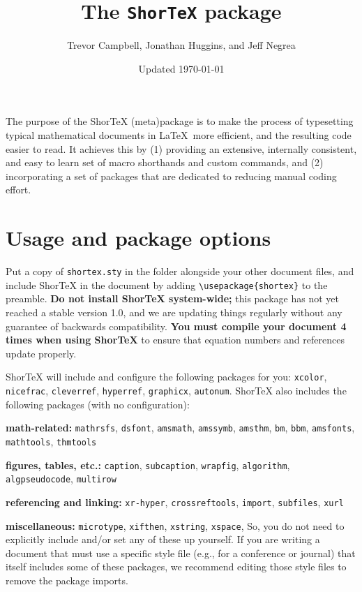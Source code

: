 \documentclass{article}
\title{The \texttt{ShorTeX} package}
\author{Trevor Campbell, Jonathan Huggins, and Jeff Negrea}
\date{Updated \today}
\begin{document}
\maketitle

\babs

The purpose of the ShorTeX (meta)package is to make the process of typesetting
typical mathematical documents in \LaTeX~more efficient, and the resulting
code easier to read.  It achieves this by
(1) providing an
extensive, internally consistent, and easy to learn set of macro
shorthands and custom commands, and
(2) incorporating a set of packages that are
dedicated to reducing manual coding effort.
\eabs


\tableofcontents

\section{Usage and package options}\label{sec:usage}

Put a copy of \texttt{shortex.sty} in the folder
alongside your other document files, and
include ShorTeX in the document by adding \verb!\usepackage{shortex}! to the preamble.
\textbf{Do not install ShorTeX system-wide;} this package has not yet reached a stable version 1.0,
and we are updating things regularly without any guarantee of backwards
compatibility.
\textbf{You must compile your document 4 times when using ShorTeX} to ensure that equation
numbers and references update properly.

ShorTeX will include and configure the following packages for you:
\texttt{xcolor},
\texttt{nicefrac},
\texttt{cleverref},
\texttt{hyperref},
\texttt{graphicx},
\texttt{autonum}.
ShorTeX also includes the following packages (with no configuration):
\bitem
\item \textbf{math-related:}  \texttt{mathrsfs}, \texttt{dsfont}, \texttt{amsmath}, \texttt{amssymb}, \texttt{amsthm}, \texttt{bm}, \texttt{bbm}, \texttt{amsfonts}, \texttt{mathtools}, \texttt{thmtools}
\item \textbf{figures, tables, etc.:}   \texttt{caption}, \texttt{subcaption}, \texttt{wrapfig}, \texttt{algorithm}, \linebreak \texttt{algpseudocode}, \texttt{multirow}
\item \textbf{referencing and linking:}  \texttt{xr-hyper}, \texttt{crossreftools}, \texttt{import}, \texttt{subfiles}, \texttt{xurl}
\item \textbf{miscellaneous:} \texttt{microtype}, \texttt{xifthen}, \texttt{xstring}, \texttt{xspace},
\eitem
So, you do not need to explicitly include and/or set any of these up yourself.
If you are writing a document that must use a specific style file (e.g., for a conference or journal) that itself
includes some of these packages, we recommend editing those style files to remove the package imports.
\end{document}
